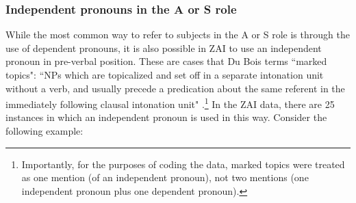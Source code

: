 \subsubsection{Independent pronouns in the A or S role}\label{markedtopics}

While the most common way to refer to subjects in the A or S role is through the use of dependent pronouns, it is also possible in ZAI to use an independent pronoun in pre-verbal position. These are cases that Du Bois terms ``marked topics": ``NPs which are topicalized and set off in a separate intonation unit without a verb, and usually precede a predication about the same referent in the immediately following clausal intonation unit" \citep[814, note 11]{dubois1987}.\footnote{Importantly, for the purposes of coding the data, marked topics were treated as one mention (of an independent pronoun), not two mentions (one independent pronoun plus one dependent pronoun).} In the ZAI data, there are 25 instances in which an independent pronoun is used in this way. Consider the following example: 


